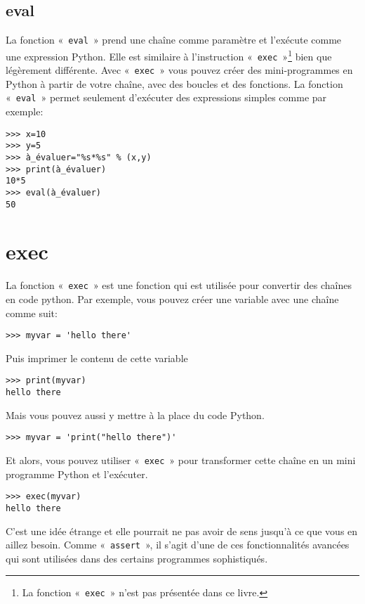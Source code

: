 \subsection*{eval}

La fonction « \texttt{eval} » prend une chaîne comme paramètre et l'exécute comme une expression Python. Elle est similaire à l'instruction « \texttt{exec} »\footnote{La fonction « \texttt{exec} » n'est pas présentée dans ce livre.} bien que légèrement différente. Avec « \texttt{exec} » vous pouvez créer des mini-programmes en Python à partir de votre chaîne, avec des boucles et des fonctions. La fonction « \texttt{eval} » permet seulement d'exécuter des expressions simples comme par exemple:
\begin{Verbatim}[frame=single,rulecolor=\color{gray}]
>>> x=10
>>> y=5
>>> à_évaluer="%s*%s" % (x,y)
>>> print(à_évaluer)
10*5
>>> eval(à_évaluer)
50
\end{Verbatim}

\section*{exec}

La fonction « \texttt{exec} » est une fonction qui est utilisée pour convertir des chaînes en code python. Par exemple, vous pouvez créer une variable avec une chaîne comme suit:
\begin{Verbatim}[frame=single,rulecolor=\color{gray}]
>>> myvar = 'hello there'
\end{Verbatim}

Puis imprimer le contenu de cette variable
\begin{Verbatim}[frame=single,rulecolor=\color{gray}]
>>> print(myvar)
hello there
\end{Verbatim}

Mais vous pouvez aussi y mettre à la place du code Python.
\begin{Verbatim}[frame=single,rulecolor=\color{gray}]
>>> myvar = 'print("hello there")'
\end{Verbatim}

Et alors, vous pouvez utiliser « \texttt{exec} » pour transformer cette chaîne en un mini programme Python et l'exécuter.
\begin{Verbatim}[frame=single,rulecolor=\color{gray}]
>>> exec(myvar)
hello there
\end{Verbatim}

C'est une idée étrange et elle pourrait ne pas avoir de sens jusqu'à ce que vous en aillez besoin. Comme « \texttt{assert} », il s'agit d'une de ces fonctionnalités   avancées qui sont utilisées dans des certains programmes sophistiqués.



